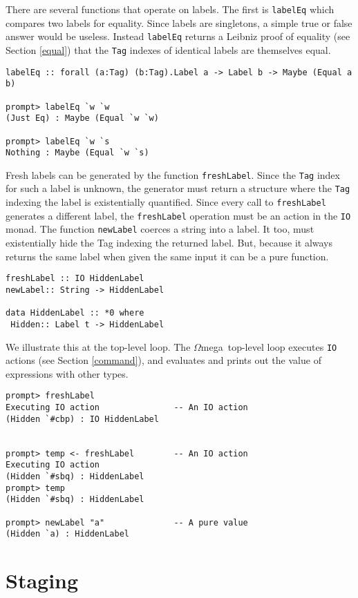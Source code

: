 \documentclass[11pt,twoside]{article}
\newcommand{\om}{$\Omega$mega}
\begin{document}
There are several functions that operate on labels. The first is
{\tt labelEq} which compares two labels for equality. Since labels
are singletons, a simple true or false answer would be useless.
Instead {\tt labelEq} returns a Leibniz proof of equality 
(see Section \ref{equal}) that the {\tt Tag}
indexes of identical labels are themselves equal.
\begin{verbatim}
labelEq :: forall (a:Tag) (b:Tag).Label a -> Label b -> Maybe (Equal a b)

prompt> labelEq `w `w
(Just Eq) : Maybe (Equal `w `w)

prompt> labelEq `w `s
Nothing : Maybe (Equal `w `s)
\end{verbatim}

Fresh labels can be generated by the function {\tt freshLabel}.
Since the {\tt Tag} index for such a label is unknown, the generator
must return a structure where the
{\tt Tag} indexing the label is existentially quantified. Since every call
to {\tt freshLabel} generates a different label, the {\tt freshLabel}
operation must be an action in the {\tt IO} monad. The function
{\tt newLabel} coerces a string into a label. It too, must
existentially hide the Tag indexing the returned label. But,
because it always returns the same label when given the same input
it can be a pure function.

\begin{verbatim}
freshLabel :: IO HiddenLabel
newLabel:: String -> HiddenLabel

data HiddenLabel :: *0 where 
 Hidden:: Label t -> HiddenLabel
\end{verbatim}
We illustrate this at the top-level loop. The \om\ top-level loop executes
{\tt IO} actions (see Section \ref{command}), and evaluates and prints
out the value of expressions with other types.
\begin{verbatim}
prompt> freshLabel
Executing IO action               -- An IO action
(Hidden `#cbp) : IO HiddenLabel


prompt> temp <- freshLabel        -- An IO action
Executing IO action
(Hidden `#sbq) : HiddenLabel
prompt> temp
(Hidden `#sbq) : HiddenLabel

prompt> newLabel "a"              -- A pure value
(Hidden `a) : HiddenLabel
\end{verbatim}

\section{Staging}
\end{document}
